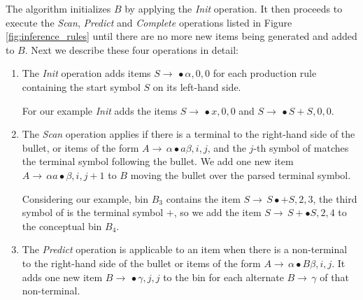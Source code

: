 \begin{isabellebody}
\begin{isamarkuptext}
The algorithm initializes $B$ by applying the \textit{Init} operation. It then proceeds to execute
the \textit{Scan}, \textit{Predict} and \textit{Complete} operations listed in Figure \ref{fig:inference_rules}
until there are no more new items being generated and added to $B$. Next we describe these four operations
in detail:

\begin{enumerate}
  \item The \textit{Init} operation adds items
    $S \rightarrow \, \bullet\alpha, 0, 0$ for each production rule containing the start symbol $S$ on its left-hand side.

    For our example \textit{Init} adds the items $S \rightarrow \, \bullet x, 0, 0$ and $S \rightarrow \, \bullet S + S, 0 , 0$.
  \item The \textit{Scan} operation applies if there is a terminal to the right-hand side of the bullet, or items of the form $A \rightarrow \, \alpha \bullet a \beta, i, j$,
    and the $j$-th symbol of \isa{{\isasymomega}} matches the terminal symbol following the bullet. We add one new item $A \rightarrow \, \alpha a \bullet \beta, i, j+1$
    to $B$ moving the bullet over the parsed terminal symbol.

    Considering our example, bin $B_3$ contains
    the item $S \rightarrow \, S \bullet + S, 2, 3$, the third symbol of \isa{{\isasymomega}} is the terminal symbol $+$, so we add the
    item $S \rightarrow \, S + \bullet S, 2, 4$ to the conceptual bin $B_4$.
  \item The \textit{Predict} operation is applicable to an item when there is a non-terminal to the right-hand side of
    the bullet or items of the form $A \rightarrow \, \alpha \bullet B \beta, i, j$. It adds one new item $B \rightarrow \, \bullet \gamma, j, j$
    to the bin for each alternate $B \rightarrow \, \gamma$ of that non-terminal.


\end{enumerate}
\end{isamarkuptext}
\end{isabellebody}
